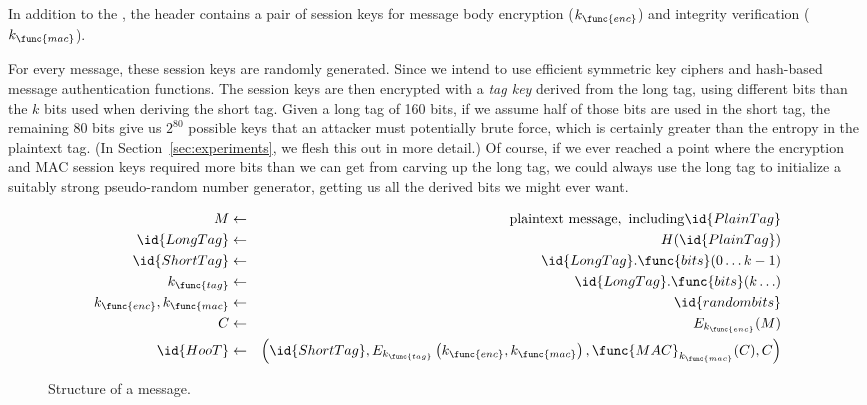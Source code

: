 %
In addition to the , the header contains a pair of
session keys
for message body encryption ($k_{\func{enc}}$) and integrity
verification ($k_{\func{mac}}$).

For every \hoot message, these session keys are randomly generated. Since we intend
to use efficient symmetric key ciphers and hash-based message authentication
functions. 
The session keys
are then encrypted with a {\em tag key} derived from the long tag, using
different bits than the $k$ bits used when deriving the
short tag. Given a long tag of 160 bits, if we assume half of those bits
are used in the short tag, the remaining 80 bits give
us $2^{80}$ possible keys that an attacker must potentially brute
force, which is certainly greater than the entropy in the
plaintext tag. (In Section~\ref{sec:experiments}, we flesh this out
in more detail.) Of course, if we ever reached a point where the
encryption and MAC session keys required more
bits than we can get from carving up the long tag, we could always
use the long tag to initialize a suitably strong pseudo-random number
generator, getting us all the derived bits we might ever want.

%

\begin{figure}
\begin{eqnarray*}
M & \leftarrow & \mathrm{plaintext\ message,\ including} \id{PlainTag}
\\
\id{LongTag} & \leftarrow & H(\id{PlainTag}) \\
\id{ShortTag} & \leftarrow & \id{LongTag}.\func{bits}(0 \ldots k-1) \\
k_{\func{tag}} & \leftarrow & \id{LongTag}.\func{bits}(k \ldots) \\
k_{\func{enc}}, k_{\func{mac}} & \leftarrow & \id{random bits} \\
C & \leftarrow & E_{k_{\func{enc}}}(M) \\
\id{HooT}  & \leftarrow &  \left(\id{ShortTag}, E_{k_{\func{tag}}}\left(k_{\func{enc}}, k_{\func{mac}}\right), \func{MAC}_{k_{\func{mac}}}(C), C\right)
\end{eqnarray*}
\caption{Structure of a \hoot message.\label{fig:hoot-structure}}
\end{figure}
%

